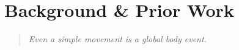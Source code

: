 \documentclass[../main.tex]{subfiles}
\begin{document}
\chapter{Background \& Prior Work}\label{chap:background}

\begin{quote}
  \emph{Even a simple movement is a global body event.}\\
\end{quote}  

\cleardoublepage%



















\end{document}
